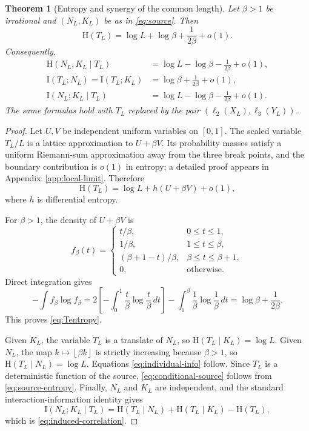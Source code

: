 \documentclass[11pt,oneside]{article}
\newtheorem{theorem}{Theorem}[section]
\theoremstyle{definition}
\theoremstyle{remark}
\newcommand{\HH}{\mathrm{H}}
\newcommand{\II}{\mathrm{I}}
\newcommand{\floor}[1]{\left\lfloor #1\right\rfloor}
\begin{document}
\begin{theorem}[Entropy and synergy of the common length]\label{thm:length-entropy}
Let $\beta>1$ be irrational and $(N_L,K_L)$ be as in \eqref{eq:source}.  Then
\begin{equation}\label{eq:Tentropy}
  \HH(T_L)=\log L+\log\beta+\frac{1}{2\beta}+o(1).
\end{equation}
Consequently,
\begin{align}
  \HH(N_L,K_L\mid T_L)
    &=\log L-\log\beta-\frac{1}{2\beta}+o(1),\label{eq:conditional-source}\\
  \II(T_L;N_L)=\II(T_L;K_L)
    &=\log\beta+\frac{1}{2\beta}+o(1),\label{eq:individual-info}\\
  \II(N_L;K_L\mid T_L)
    &=\log L-\log\beta-\frac{1}{2\beta}+o(1).\label{eq:induced-correlation}
\end{align}
The same formulas hold with $T_L$ replaced by the pair $(\ell_2(X_L),\ell_3(Y_L))$.
\end{theorem}

\begin{proof}
Let $U,V$ be independent uniform variables on $[0,1]$.  The scaled variable $T_L/L$ is a lattice approximation to $U+\beta V$.  Its probability masses satisfy a uniform Riemann-sum approximation away from the three break points, and the boundary contribution is $o(1)$ in entropy; a detailed proof appears in Appendix~\ref{app:local-limit}.  Therefore
\begin{equation}\label{eq:lattice-diff}
 \HH(T_L)=\log L+h(U+\beta V)+o(1),
\end{equation}
where $h$ is differential entropy.

For $\beta>1$, the density of $U+\beta V$ is
\begin{equation}\label{eq:trapezoid-density}
 f_\beta(t)=
 \begin{cases}
 t/\beta,&0\leq t\leq1,\\
 1/\beta,&1\leq t\leq\beta,\\
 (\beta+1-t)/\beta,&\beta\leq t\leq\beta+1,\\
 0,&\text{otherwise}.
 \end{cases}
\end{equation}
Direct integration gives
\[
 -\int f_\beta\log f_\beta
 =2\left[-\int_0^1\frac{t}{\beta}\log\frac{t}{\beta}\,dt\right]
   -\int_1^\beta\frac1\beta\log\frac1\beta\,dt
 =\log\beta+\frac1{2\beta}.
\]
This proves \eqref{eq:Tentropy}.

Given $K_L$, the variable $T_L$ is a translate of $N_L$, so
$\HH(T_L\mid K_L)=\log L$.  Given $N_L$, the map
$k\mapsto\floor{\beta k}$ is strictly increasing because $\beta>1$, so
$\HH(T_L\mid N_L)=\log L$.  Equations \eqref{eq:individual-info} follow.  Since $T_L$ is a deterministic function of the source, \eqref{eq:conditional-source} follows from \eqref{eq:source-entropy}.  Finally, $N_L$ and $K_L$ are independent, and the standard interaction-information identity gives
\[
 \II(N_L;K_L\mid T_L)
 =\HH(T_L\mid N_L)+\HH(T_L\mid K_L)-\HH(T_L),
\]
which is \eqref{eq:induced-correlation}.
\end{proof}
\end{document}
